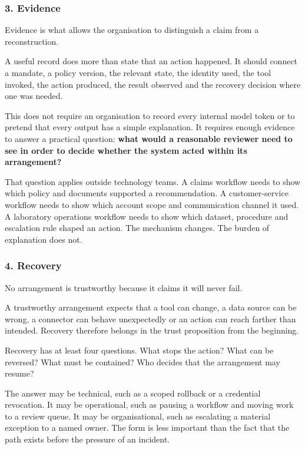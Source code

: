 \subsubsection{3. Evidence}\label{evidence}

Evidence is what allows the organisation to distinguish a claim from a
reconstruction.

A useful record does more than state that an action happened. It should
connect a mandate, a policy version, the relevant state, the identity
used, the tool invoked, the action produced, the result observed and the
recovery decision where one was needed.

This does not require an organisation to record every internal model
token or to pretend that every output has a simple explanation. It
requires enough evidence to answer a practical question: \textbf{what
would a reasonable reviewer need to see in order to decide whether the
system acted within its arrangement?}

That question applies outside technology teams. A claims workflow needs
to show which policy and documents supported a recommendation. A
customer-service workflow needs to show which account scope and
communication channel it used. A laboratory operations workflow needs to
show which dataset, procedure and escalation rule shaped an action. The
mechanism changes. The burden of explanation does not.

\subsubsection{4. Recovery}\label{recovery}

No arrangement is trustworthy because it claims it will never fail.

A trustworthy arrangement expects that a tool can change, a data source
can be wrong, a connector can behave unexpectedly or an action can reach
farther than intended. Recovery therefore belongs in the trust
proposition from the beginning.

Recovery has at least four questions. What stops the action? What can be
reversed? What must be contained? Who decides that the arrangement may
resume?

The answer may be technical, such as a scoped rollback or a credential
revocation. It may be operational, such as pausing a workflow and moving
work to a review queue. It may be organisational, such as escalating a
material exception to a named owner. The form is less important than the
fact that the path exists before the pressure of an incident.

